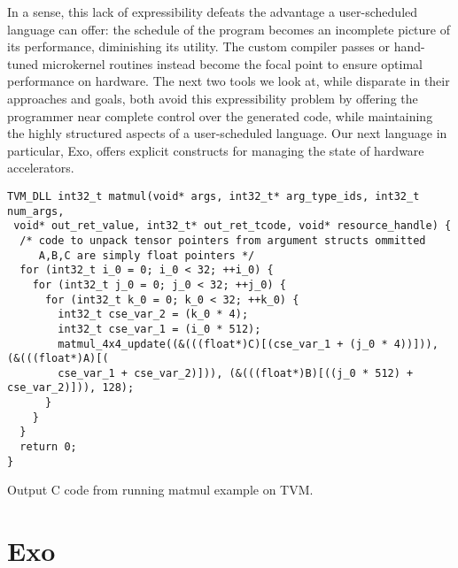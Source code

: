 \documentclass[acmsmall, nonacm=true]{acmart}
\begin{document}
In a sense, this lack of expressibility defeats the advantage a user-scheduled language can offer: the schedule of the program becomes an incomplete picture of its performance, diminishing its utility. The custom compiler passes or hand-tuned microkernel routines instead become the focal point to ensure optimal performance on hardware. The next two tools we look at, while disparate in their approaches and goals, both avoid this expressibility problem by  offering the programmer near complete control over the generated code, while maintaining the highly structured aspects of a user-scheduled language. Our next language in particular, Exo, offers explicit constructs for managing the state of hardware accelerators.


\begin{listing}
\centering
\begin{verbatim}
TVM_DLL int32_t matmul(void* args, int32_t* arg_type_ids, int32_t num_args,
 void* out_ret_value, int32_t* out_ret_tcode, void* resource_handle) {
  /* code to unpack tensor pointers from argument structs ommitted
     A,B,C are simply float pointers */
  for (int32_t i_0 = 0; i_0 < 32; ++i_0) {
    for (int32_t j_0 = 0; j_0 < 32; ++j_0) {
      for (int32_t k_0 = 0; k_0 < 32; ++k_0) {
        int32_t cse_var_2 = (k_0 * 4);
        int32_t cse_var_1 = (i_0 * 512);
        matmul_4x4_update((&(((float*)C)[(cse_var_1 + (j_0 * 4))])), (&(((float*)A)[(
        cse_var_1 + cse_var_2)])), (&(((float*)B)[((j_0 * 512) + cse_var_2)])), 128);
      }
    }
  }
  return 0;
}
\end{verbatim}
\caption{Output C code from running matmul example on TVM.}
\label{lst:tvm_output}
\end{listing}

\section{Exo}







\clearpage
\end{document}
